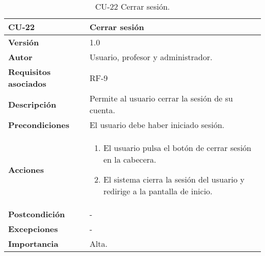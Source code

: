 \begin{table}[h!]
	\centering
	\begin{tabularx}{\linewidth}{ p{} p{} }
		\toprule
		\textbf{CU-22}    & \textbf{Cerrar sesión}\\
		\toprule
		\textbf{Versión}              & 1.0    \\
		\textbf{Autor}                & Usuario, profesor y administrador. \\
		\textbf{Requisitos asociados} & RF-9 \\
		\textbf{Descripción}          & Permite al usuario cerrar la sesión de su cuenta. \\
		\textbf{Precondiciones}         & El usuario debe haber iniciado sesión. \\
		\textbf{Acciones}             &
		\begin{enumerate}
			\def\labelenumi{\arabic{enumi}.}
			\tightlist
			\item El usuario pulsa el botón de cerrar sesión en la cabecera.
            \item El sistema cierra la sesión del usuario y redirige a la pantalla de inicio.
		\end{enumerate}\\
         \textbf{Postcondición}             & - \\
		\textbf{Excepciones}             & - \\
		\textbf{Importancia}          & Alta. \\
		\bottomrule
	\end{tabularx}
	\caption{CU-22 Cerrar sesión.}
\end{table}
